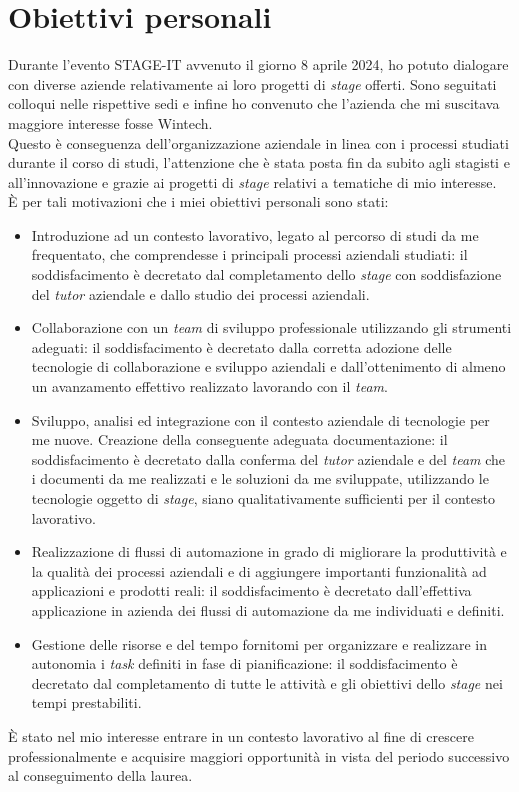 \section{Obiettivi personali}
Durante l'evento STAGE-IT avvenuto il giorno 8 aprile 2024, ho potuto dialogare con diverse aziende relativamente ai loro progetti di \emph{stage} offerti. Sono seguitati colloqui nelle rispettive sedi e infine ho convenuto che l'azienda che mi suscitava maggiore interesse fosse Wintech.\\
Questo è conseguenza dell'organizzazione aziendale in linea con i processi studiati durante il corso di studi, l'attenzione che è stata posta fin da subito agli stagisti e all'innovazione e grazie ai progetti di \emph{stage} relativi a tematiche di mio interesse.\\
È per tali motivazioni che i miei obiettivi personali sono stati:
\begin{itemize}
    \item Introduzione ad un contesto lavorativo, legato al percorso di studi da me frequentato, che comprendesse i principali processi aziendali studiati: il soddisfacimento è decretato dal completamento dello \emph{stage} con soddisfazione del \emph{tutor} aziendale e dallo studio dei processi aziendali. 
    \item Collaborazione con un \emph{team} di sviluppo professionale utilizzando gli strumenti adeguati: il soddisfacimento è decretato dalla corretta adozione delle tecnologie di collaborazione e sviluppo aziendali e dall'ottenimento di almeno un avanzamento effettivo realizzato lavorando con il \emph{team}. 
    \item Sviluppo, analisi ed integrazione con il contesto aziendale di tecnologie per me nuove. Creazione della conseguente adeguata documentazione: il soddisfacimento è decretato dalla conferma del \emph{tutor} aziendale e del \emph{team} che i documenti da me realizzati e le soluzioni da me sviluppate, utilizzando le tecnologie oggetto di \emph{stage}, siano qualitativamente sufficienti per il contesto lavorativo. 
    \item Realizzazione di flussi di automazione in grado di migliorare la produttività e la qualità dei processi aziendali e di aggiungere importanti funzionalità ad applicazioni e prodotti reali: il soddisfacimento è decretato dall'effettiva applicazione in azienda dei flussi di automazione da me individuati e definiti. 
    \item Gestione delle risorse e del tempo fornitomi per organizzare e realizzare in autonomia i \emph{task} definiti in fase di pianificazione: il soddisfacimento è decretato dal completamento di tutte le attività e gli obiettivi dello \emph{stage} nei tempi prestabiliti.\\
\end{itemize}
È stato nel mio interesse entrare in un contesto lavorativo al fine di crescere professionalmente e acquisire maggiori opportunità in vista del periodo successivo al conseguimento della laurea. 
 
 
